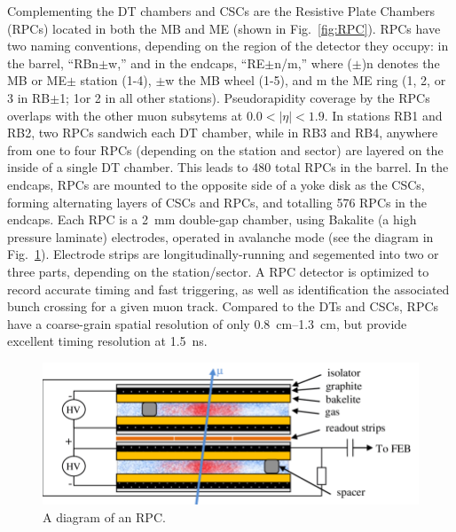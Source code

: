 
Complementing the DT chambers and CSCs are the Resistive Plate Chambers (RPCs) located in both the MB and ME (shown in Fig.~\ref{fig:RPC}). RPCs have two naming conventions, depending on the region of the detector they occupy: in the barrel, ``RBn$\pm$w,'' and in the endcaps, ``RE$\pm$n/m,'' where ($\pm$)n denotes the MB or ME$\pm$ station (1-4), $\pm$w the MB wheel (1-5), and m the ME ring (1, 2, or 3 in RB$\pm$1; 1or 2 in all other stations). Pseudorapidity coverage by the RPCs overlaps with the other muon subsytems at $0.0 < |\eta| < 1.9$. In stations RB1 and RB2, two RPCs sandwich each DT chamber, while in RB3 and RB4, anywhere from one to four RPCs (depending on the station and sector) are layered on the inside of a single DT chamber. This leads to 480 total RPCs in the barrel. In the endcaps, RPCs are mounted to the opposite side of a yoke disk as the CSCs, forming alternating layers of CSCs and RPCs, and totalling 576 RPCs in the endcaps. Each RPC is a \SI{2}{mm} double-gap chamber, using Bakalite (a high pressure laminate) electrodes, operated in avalanche mode (see the diagram in Fig.~\ref{fig:RPCDiagram}). Electrode strips are longitudinally-running and segemented into two or three parts, depending on the station/sector. A RPC detector is optimized to record accurate timing and fast triggering, as well as identification the associated bunch crossing for a given muon track. Compared to the DTs and CSCs, RPCs have a coarse-grain spatial resolution of only \SIrange{0.8}{1.3}{cm}, but provide excellent timing resolution at \SI{1.5}{ns}.

\begin{figure}[H]
    \centering
    \includegraphics[width=\textwidth]{Images/CMS/RPCDiagram.png}
    \caption{A diagram of an RPC.}
    \label{fig:RPCDiagram}
\end{figure}


